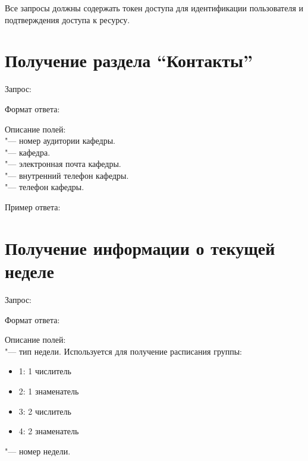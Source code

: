 Все запросы должны содержать токен доступа для идентификации пользователя и подтверждения доступа к ресурсу.

\section{Получение раздела ``Контакты''}
\label{sec:contacts}

Запрос: 

Формат ответа:
\begin{listing}[H]
\end{listing}
\vspace{-0.75cm}

Описание полей:\\
 "--- номер аудитории кафедры.\\
 "--- кафедра.\\
 "--- электронная почта кафедры.\\
 "--- внутренний телефон кафедры.\\
 "--- телефон кафедры.

Пример ответа:
\begin{listing}[H]
\end{listing}
\vspace{-0.75cm}

\section{Получение информации о текущей неделе}
\label{sec:faq}

Запрос: 

Формат ответа:
\begin{listing}[H]
\end{listing}
\vspace{-0.75cm}

Описание полей:\\
 "--- тип недели.
Используется для получение расписания группы:
\begin{itemize}
  \item 1: 1 числитель
  \item 2: 1 знаменатель
  \item 3: 2 числитель
  \item 4: 2 знаменатель
\end{itemize}
 "--- номер недели.

